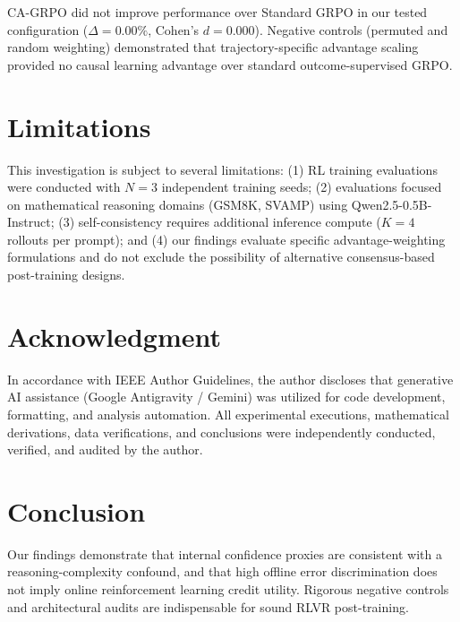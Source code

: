 \documentclass[journal]{IEEEtai}
\begin{document}
CA-GRPO did not improve performance over Standard GRPO in our tested configuration ($\Delta = 0.00\%$, Cohen's $d = 0.000$). Negative controls (permuted and random weighting) demonstrated that trajectory-specific advantage scaling provided no causal learning advantage over standard outcome-supervised GRPO.

\section{Limitations}
This investigation is subject to several limitations: (1) RL training evaluations were conducted with $N=3$ independent training seeds; (2) evaluations focused on mathematical reasoning domains (GSM8K, SVAMP) using Qwen2.5-0.5B-Instruct; (3) self-consistency requires additional inference compute ($K=4$ rollouts per prompt); and (4) our findings evaluate specific advantage-weighting formulations and do not exclude the possibility of alternative consensus-based post-training designs.

\section*{Acknowledgment}
In accordance with IEEE Author Guidelines, the author discloses that generative AI assistance (Google Antigravity / Gemini) was utilized for code development, formatting, and analysis automation. All experimental executions, mathematical derivations, data verifications, and conclusions were independently conducted, verified, and audited by the author.

\section{Conclusion}
Our findings demonstrate that internal confidence proxies are consistent with a reasoning-complexity confound, and that high offline error discrimination does not imply online reinforcement learning credit utility. Rigorous negative controls and architectural audits are indispensable for sound RLVR post-training.



\end{document}

